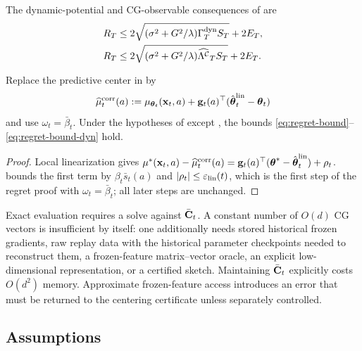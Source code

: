 The dynamic-potential and CG-observable consequences of  are
\begin{equation}\label{eq:regret-bound-dyn}
\begin{aligned}
R_T&\le2\sqrt{(\sigma^2+G^2/\lambda)\Gamma^{\mathrm{dyn}}_T S_T}+2E_T,\\
R_T&\le2\sqrt{(\sigma^2+G^2/\lambda)\widehat{\Lambda^{\mathcal{C}}}_T S_T}+2E_T.
\end{aligned}
\end{equation}

\begin{corollary}\label{cor:corrected-center}
Replace the predictive center in  by
\begin{equation}\label{eq:corrected-center}
\widehat\mu_t^{\mathrm{corr}}(a):=\mu_{\boldsymbol{\theta}_t}(\mathbf{x}_t,a)
+\mathbf{g}_t(a)^\top(\hat{\boldsymbol{\theta}}_t^{\mathrm{lin}}-\boldsymbol{\theta}_t)
\end{equation}
and use $\omega_t=\bar\beta_t$.  Under the hypotheses of
 except , the bounds
\eqref{eq:regret-bound}--\eqref{eq:regret-bound-dyn} hold.
\end{corollary}
\begin{proof}
Local linearization gives
$\mu^*(\mathbf{x}_t,a)-\widehat\mu_t^{\mathrm{corr}}(a)
=\mathbf{g}_t(a)^\top(\boldsymbol{\theta}^*-\hat{\boldsymbol{\theta}}_t^{\mathrm{lin}})+\rho_t$.
 bounds the first term by
$\beta_t\bar s_t(a)$ and $|\rho_t|\le\varepsilon_{\mathrm{lin}}(t)$, which is the first step
of the regret proof with $\omega_t=\bar\beta_t$; all later steps are unchanged.
\end{proof}

\begin{remark}
Exact evaluation requires a solve against $\bar{\mathbf{C}}_t$.  A constant number of
$O(d)$ CG vectors is insufficient by itself: one additionally needs stored
historical frozen gradients, raw replay data with the historical parameter
checkpoints needed to reconstruct them, a frozen-feature matrix--vector oracle,
an explicit low-dimensional representation, or a certified sketch.  Maintaining
$\bar{\mathbf{C}}_t$ explicitly costs $O(d^2)$ memory.  Approximate frozen-feature access
introduces an error that must be returned to the centering certificate unless
separately controlled.
\end{remark}

\subsection{Assumptions}\label{sec:assumptions}

